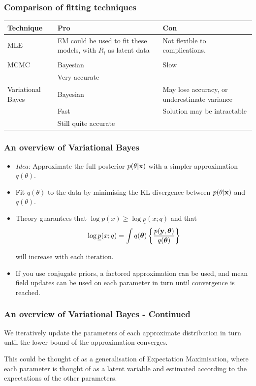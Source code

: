 \documentclass{beamer}
\begin{document}

\begin{frame}
\frametitle{Comparison of fitting techniques}
\begin{tabular}{p{2cm}p{3.5cm}p{4.5cm}}
Technique & Pro & Con \\
\hline
MLE & EM could be used to fit these models, with $R_i$ as latent data & Not flexible to complications. \\
& & \\ %
\hline
MCMC & Bayesian & Slow \\
	& Very accurate &  \\
\hline
Variational Bayes & Bayesian & May lose accuracy, or underestimate variance \\
& Fast  & Solution may be intractable \\ 
& Still quite accurate & \\
\hline
\end{tabular}

\end{frame}

\begin{frame}
\frametitle{An overview of Variational Bayes}
\begin{itemize}
\item \emph{Idea:} Approximate the full posterior $p(\theta|{\bf x})$ with a simpler approximation $q(\theta)$.

\item Fit $q(\theta)$ to the data by minimising the KL divergence between $p(\theta|{\bf x})$ and $q(\theta)$.

\item Theory guarantees that $\log p(x)\ge 
\log \underline{p}(x;q)$ and that 
$$
\log \underline{p}(x;q) = \int q({\boldsymbol \theta}) \left\{ \frac{p({\bf y},{\boldsymbol \theta})}{q({\boldsymbol \theta})} \right\}
$$ 

\noindent will
increase with each iteration.

\item If you use conjugate priors, a factored approximation can be used, and mean field updates can be used on
each parameter in turn until convergence is reached.
\end{itemize}
\end{frame}

\begin{frame}
\frametitle{An overview of Variational Bayes - Continued}
We iteratively update the parameters of each approximate distribution
in turn until the lower bound of the approximation converges.

\bigskip 
This could be thought of as a generalisation of Expectation Maximisation, where each parameter is thought of as a latent
variable and estimated according to the expectations of the other parameters.
\end{frame}
\end{document}
